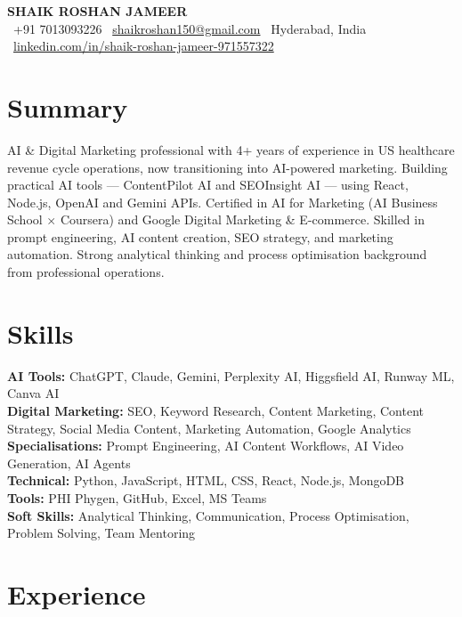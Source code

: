 \documentclass[10pt,a4paper]{article}
\begin{document}
{\LARGE \textbf{SHAIK ROSHAN JAMEER}} \\
\vspace{2pt}
\faPhone\ +91 7013093226 \hspace{10pt}
\faEnvelope\ \href{mailto:shaikroshan150@gmail.com}{shaikroshan150@gmail.com} \hspace{10pt}
\faMapMarker*\ Hyderabad, India \\
\vspace{2pt}
\faLinkedin\ \href{https://linkedin.com/in/shaik-roshan-jameer-971557322}{linkedin.com/in/shaik-roshan-jameer-971557322}

\section*{Summary}
AI \& Digital Marketing professional with 4+ years of experience in US healthcare revenue cycle operations, now transitioning into AI-powered marketing. Building practical AI tools --- ContentPilot AI and SEOInsight AI --- using React, Node.js, OpenAI and Gemini APIs. Certified in AI for Marketing (AI Business School $\times$ Coursera) and Google Digital Marketing \& E-commerce. Skilled in prompt engineering, AI content creation, SEO strategy, and marketing automation. Strong analytical thinking and process optimisation background from professional operations.

\section*{Skills}
\textbf{AI Tools:} ChatGPT, Claude, Gemini, Perplexity AI, Higgsfield AI, Runway ML, Canva AI \\
\textbf{Digital Marketing:} SEO, Keyword Research, Content Marketing, Content Strategy, Social Media Content, Marketing Automation, Google Analytics \\
\textbf{Specialisations:} Prompt Engineering, AI Content Workflows, AI Video Generation, AI Agents \\
\textbf{Technical:} Python, JavaScript, HTML, CSS, React, Node.js, MongoDB \\
\textbf{Tools:} PHI Phygen, GitHub, Excel, MS Teams \\
\textbf{Soft Skills:} Analytical Thinking, Communication, Process Optimisation, Problem Solving, Team Mentoring

\section*{Experience}
\end{document}
